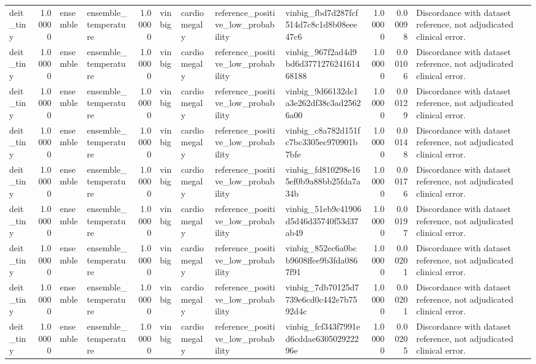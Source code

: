 \begin{tabular}{lrllrllllrrl}
deit\_tiny & 1.00000 & ensemble & ensemble\_temperature & 1.00000 & vinbig & cardiomegaly & reference\_positive\_low\_probability & vinbig\_fbd7d287fcf514d7c8c1d8b08eee47c6 & 1.00000 & 0.00098 & Discordance with dataset reference, not adjudicated clinical error. \\
deit\_tiny & 1.00000 & ensemble & ensemble\_temperature & 1.00000 & vinbig & cardiomegaly & reference\_positive\_low\_probability & vinbig\_967f2ad4d9bd6d377127624161468188 & 1.00000 & 0.00106 & Discordance with dataset reference, not adjudicated clinical error. \\
deit\_tiny & 1.00000 & ensemble & ensemble\_temperature & 1.00000 & vinbig & cardiomegaly & reference\_positive\_low\_probability & vinbig\_9d66132dc1a3e262df38c3ad25626a00 & 1.00000 & 0.00129 & Discordance with dataset reference, not adjudicated clinical error. \\
deit\_tiny & 1.00000 & ensemble & ensemble\_temperature & 1.00000 & vinbig & cardiomegaly & reference\_positive\_low\_probability & vinbig\_c8a782d151fc7bc3305ec970901b7bfe & 1.00000 & 0.00148 & Discordance with dataset reference, not adjudicated clinical error. \\
deit\_tiny & 1.00000 & ensemble & ensemble\_temperature & 1.00000 & vinbig & cardiomegaly & reference\_positive\_low\_probability & vinbig\_fd810298e165ef0b9a88bb25fda7a34b & 1.00000 & 0.00176 & Discordance with dataset reference, not adjudicated clinical error. \\
deit\_tiny & 1.00000 & ensemble & ensemble\_temperature & 1.00000 & vinbig & cardiomegaly & reference\_positive\_low\_probability & vinbig\_51eb9c41906d5d46d35740f53d37ab49 & 1.00000 & 0.00197 & Discordance with dataset reference, not adjudicated clinical error. \\
deit\_tiny & 1.00000 & ensemble & ensemble\_temperature & 1.00000 & vinbig & cardiomegaly & reference\_positive\_low\_probability & vinbig\_852ec6a0bcb9608ffee9b3fda0867f91 & 1.00000 & 0.00201 & Discordance with dataset reference, not adjudicated clinical error. \\
deit\_tiny & 1.00000 & ensemble & ensemble\_temperature & 1.00000 & vinbig & cardiomegaly & reference\_positive\_low\_probability & vinbig\_7db70125d7739e6cd0c442e7b7592d4c & 1.00000 & 0.00201 & Discordance with dataset reference, not adjudicated clinical error. \\
deit\_tiny & 1.00000 & ensemble & ensemble\_temperature & 1.00000 & vinbig & cardiomegaly & reference\_positive\_low\_probability & vinbig\_fcf343f7991ed6cddae630502922296e & 1.00000 & 0.00205 & Discordance with dataset reference, not adjudicated clinical error. \\

\end{tabular}
